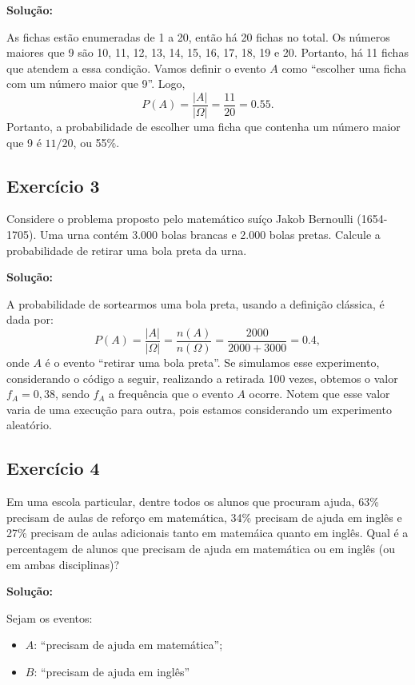 \documentclass{article}
\begin{document}
\vspace{0.5cm}
\textbf{Solução:}

As fichas estão enumeradas de 1 a 20, então há 20 fichas no total. Os números maiores que 9 são 10, 11, 12, 13, 14, 15, 16, 17, 18, 19 e 20. Portanto, há 11 fichas que atendem a essa condição.  
Vamos definir o evento $A$ como ``escolher uma ficha com um número maior que 9''.  
Logo,
    $$
    P(A) = \frac{|A|}{|\Omega|} = \frac{11}{20} = 0.55.
    $$
Portanto, a probabilidade de escolher uma ficha que contenha um número maior que 9 é $11/20$, ou 55\%.

\subsection{Exercício 3}
Considere o problema proposto pelo matemático suíço Jakob Bernoulli (1654-1705). Uma urna contém 3.000 bolas brancas e 2.000 bolas pretas. Calcule a probabilidade de retirar uma bola preta da urna.

\vspace{0.5cm}
\textbf{Solução:}

A probabilidade de sortearmos uma bola preta, usando a definição clássica, é dada por:
    $$
    P(A) = \frac{|A|}{|\Omega|} = \frac{n(A)}{n(\Omega)} = 
    \frac{2000}{2000 + 3000} = 0.4,
    $$
onde $A$ é o evento ``retirar uma bola preta''.  
Se simulamos esse experimento, considerando o código a seguir, realizando a retirada 100 vezes, obtemos o valor $f_A = 0,38$, sendo $f_A$ a frequência que o evento $A$ ocorre.  
Notem que esse valor varia de uma execução para outra, pois estamos considerando um experimento aleatório.

\subsection{Exercício 4}
Em uma escola particular, dentre todos os alunos que
procuram ajuda, 63\% precisam de aulas de reforço em matemática, 34\% precisam de ajuda em inglês e 27\% precisam de aulas adicionais tanto em matemáica quanto em inglês. Qual é a percentagem de alunos que precisam de ajuda em matemática ou em inglês (ou em ambas disciplinas)?

\vspace{0.5cm}
\textbf{Solução:}

Sejam os eventos:
\begin{itemize}
    \item $A$: ``precisam de ajuda em matemática'';
    \item $B$: ``precisam de ajuda em inglês''
\end{itemize}
\end{document}
